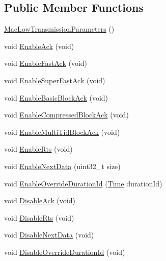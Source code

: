 \subsection*{Public Member Functions}
\begin{DoxyCompactItemize}
\item 
\hyperlink{classns3_1_1MacLowTransmissionParameters_a7428f14a8f8e3d44baa15c447a8abd59}{Mac\+Low\+Transmission\+Parameters} ()
\item 
void \hyperlink{classns3_1_1MacLowTransmissionParameters_aa2db70f6786b7d0b9d9cc453b2292f2b}{Enable\+Ack} (void)
\item 
void \hyperlink{classns3_1_1MacLowTransmissionParameters_a9edb786bdcc6a744df2efccad4e8432a}{Enable\+Fast\+Ack} (void)
\item 
void \hyperlink{classns3_1_1MacLowTransmissionParameters_a81748217f9861b5216bdf5709e8cc7f0}{Enable\+Super\+Fast\+Ack} (void)
\item 
void \hyperlink{classns3_1_1MacLowTransmissionParameters_a69435eb15eee75dc6f5fc24c92f05f81}{Enable\+Basic\+Block\+Ack} (void)
\item 
void \hyperlink{classns3_1_1MacLowTransmissionParameters_af936390c4e2ee33eb55cfc36cec20bf4}{Enable\+Compressed\+Block\+Ack} (void)
\item 
void \hyperlink{classns3_1_1MacLowTransmissionParameters_abec20a2554e913134815d463a4ea9f23}{Enable\+Multi\+Tid\+Block\+Ack} (void)
\item 
void \hyperlink{classns3_1_1MacLowTransmissionParameters_a119d03769cf51e528d03f686c6bd8ed5}{Enable\+Rts} (void)
\item 
void \hyperlink{classns3_1_1MacLowTransmissionParameters_a33fc05383c3f611ca1be7d33a01a1774}{Enable\+Next\+Data} (uint32\+\_\+t size)
\item 
void \hyperlink{classns3_1_1MacLowTransmissionParameters_ada826a6182456753c5c4506af4a2485f}{Enable\+Override\+Duration\+Id} (\hyperlink{classns3_1_1Time}{Time} duration\+Id)
\item 
void \hyperlink{classns3_1_1MacLowTransmissionParameters_ae09e5316ed859ddca19bfbaec3b07704}{Disable\+Ack} (void)
\item 
void \hyperlink{classns3_1_1MacLowTransmissionParameters_a18b2f706b138952bc351538e59b723f4}{Disable\+Rts} (void)
\item 
void \hyperlink{classns3_1_1MacLowTransmissionParameters_a6944fa0c62fd004c94b845ba1b474b87}{Disable\+Next\+Data} (void)
\item 
void \hyperlink{classns3_1_1MacLowTransmissionParameters_a87d54f760f2a012e29e7b4ed7c07aacf}{Disable\+Override\+Duration\+Id} (void)

\end{DoxyCompactItemize}
